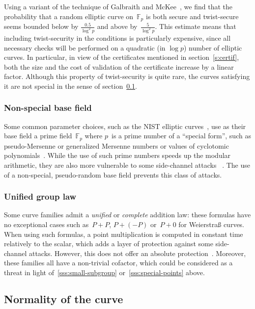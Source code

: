 \documentclass[twocolumn,letterpaper,10pt]{article}
\def\F{\mathbb{F}}
\begin{document}
Using a variant of the technique of Galbraith and McKee~\cite{lms2000gm},
we find that the probability that a random elliptic curve on~$\F_p$
is both secure and twist-secure
seems bounded below by $\frac{0.5}{\log^2 p}$
and above by~$\frac{5}{\log^2 p}$.
This estimate means that
including twist-security in the conditions is particularly expensive,
since all necessary checks will be performed on
a quadratic (in $\log p$) number of elliptic curves.
In particular, in view of
the certificates mentioned in section~\ref{s:certif},
both the size and the cost of validation of the certificate
increase by a linear factor.
Although this property of twist-security is quite rare,
the curves satisfying it are not special
in the sense of section~\ref{ss:normal}.

\subsubsection{Non-special base field}
\label{sss:special-side}

Some common parameter choices,
such as the NIST elliptic curves~\cite{nist2000fips186-2},
use as their base field a prime field~$\F_p$
where $p$~is a prime number of a ``special form'',
such as pseudo-Mersenne or generalized Mersenne numbers
or values of cyclotomic polynomials~\cite{mc2013gm}.
While the use of such prime numbers speeds up the modular arithmetic,
they are also more vulnerable to some side-channel attacks%
~\cite{ches2005dkj,ics2005ss,ches2014bpsy,eprint2014-434,ieice2006ss,indo2014frv}.
The use of a non-special, pseudo-random base field
prevents this class of attacks.

\subsubsection{Unified group law}
\label{sss:unified}

Some curve families admit a \emph{unified} or \emph{complete}
addition law: these formulas have no exceptional cases
such as~$P + P$, $P + (-P)$ or~$P + 0$ for Weierstraß curves.
When using such formulas, a point multiplication
is computed in constant time relatively to the scalar,
which adds a layer of protection against some side-channel attacks.
However, this does not offer an absolute protection~\cite{indo2014frv}.
Moreover, these families all have a non-trivial cofactor,
which could be considered as a threat
in light of~\ref{sss:small-subgroup} or~\ref{sss:special-points} above.

\subsection{Normality of the curve}
\label{ss:normal}
\end{document}

